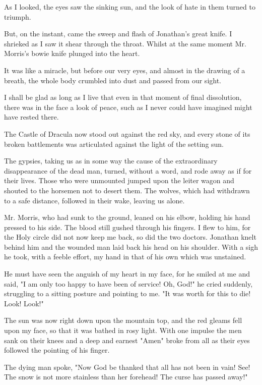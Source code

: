 As I looked, the eyes saw the sinking sun, and the look of hate in them turned to triumph. 

But, on the instant, came the sweep and flash of Jonathan's great knife. I shrieked as I saw it shear through the throat. Whilst at the same moment Mr. Morris's bowie knife plunged into the heart. 

It was like a miracle, but before our very eyes, and almost in the drawing of a breath, the whole body crumbled into dust and passed from our sight. 

I shall be glad as long as I live that even in that moment of final dissolution, there was in the face a look of peace, such as I never could have imagined might have rested there. 

The Castle of Dracula now stood out against the red sky, and every stone of its broken battlements was articulated against the light of the setting sun. 

The gypsies, taking us as in some way the cause of the extraordinary disappearance of the dead man, turned, without a word, and rode away as if for their lives. Those who were unmounted jumped upon the leiter wagon and shouted to the horsemen not to desert them. The wolves, which had withdrawn to a safe distance, followed in their wake, leaving us alone. 

Mr. Morris, who had sunk to the ground, leaned on his elbow, holding his hand pressed to his side. The blood still gushed through his fingers. I flew to him, for the Holy circle did not now keep me back, so did the two doctors. Jonathan knelt behind him and the wounded man laid back his head on his shoulder. With a sigh he took, with a feeble effort, my hand in that of his own which was unstained. 

He must have seen the anguish of my heart in my face, for he smiled at me and said, "I am only too happy to have been of service! Oh, God!" he cried suddenly, struggling to a sitting posture and pointing to me. "It was worth for this to die! Look! Look!" 

The sun was now right down upon the mountain top, and the red gleams fell upon my face, so that it was bathed in rosy light. With one impulse the men sank on their knees and a deep and earnest "Amen" broke from all as their eyes followed the pointing of his finger. 

The dying man spoke, "Now God be thanked that all has not been in vain! See! The snow is not more stainless than her forehead! The curse has passed away!" 

